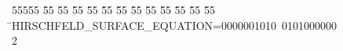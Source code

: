 %
%
\begin{tabbing}
55555 \= 55 \= 55 \= 55 \= 55 \= 55 \= 55 \= 55 \= 55 \= 55 \= 55 \= 55 \= 55 \= \>HIRSCHFELD\_SURFACE\_EQUATION=0000001010\ 0101000000\\[0pt]
2\>\end{tabbing}
